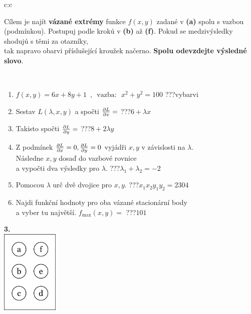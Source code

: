 \documentclass[10pt]{report}
\begin{document}
\begin{tabular}{c:c}
\begin{minipage}[c][104.5mm][t]{0.5\linewidth}
\begin{center}
\begin{minipage}{0.95\linewidth}
\begin{center}
Cílem je najít \textbf{vázané extrémy} funkce $f(x,y)$ zadané v \textbf{(a)} spolu s vazbou (podmínkou). Postupuj podle krokú v \textbf{(b)} až \textbf{(f)}. Pokud se medzivýsledky shodujú s těmi za otazníky,\\tak napravo obarvi příslušející kroužek načerno. \textbf{Spolu odevzdejte výsledné slovo}.
\end{center}
\end{minipage}
\\[1mm]
\begin{minipage}{0.79\linewidth}
\begin{center}
\begin{varwidth}{\linewidth}
\begin{enumerate}
\normalsize
\item $f(x,y)=6x+8y+1 \enspace , \enspace \mathrm{vazba:} \enspace x^2+y^2=100$\quad \dotfill\; ???\;\dotfill \quad vybarvi
\item Sestav $L(\lambda,x,y)$ a spočti $\pdv{L}{x}=$\quad \dotfill\; ???\;\dotfill \quad $6+\lambda x$
\item Takisto spočti $\pdv{L}{y}=$\quad \dotfill\; ???\;\dotfill \quad $8+2\lambda y$
\item Z podmínek $\pdv{L}{x}=0 , \pdv{L}{y}=0$ vyjádři $x,y$ v závislosti na $\lambda$.\\ \phantom{xxxxxx}Následne $x,y$ dosaď do vazbové rovnice\\ \phantom{xxxxxx}a vypočti dva výsledky pro $\lambda$.\quad \dotfill\; ???\;\dotfill \quad $\lambda_1+\lambda_2=-2$
\item Pomocou $\lambda$ urč dvě dvojice pro $x,y$.\quad \dotfill\; ???\;\dotfill \quad $x_1 x_2 y_1 y_2=2304$
\item Najdi funkční hodnoty pro oba vázané stacionární body\\ \phantom{xxxxxx}a vyber tu najvětší. $f_{\text{max}}(x,y)=$\quad \dotfill\; ???\;\dotfill \quad $101$
\end{enumerate}
\end{varwidth}
\end{center}
\end{minipage}
\begin{minipage}{0.20\linewidth}
\begin{center}
{\Huge\bfseries 3.} \\[2mm]
\includegraphics[height=40mm]{../images/braille.png}

\end{center}
\end{minipage}
\end{center}
\end{minipage}
\end{tabular}
\end{document}
